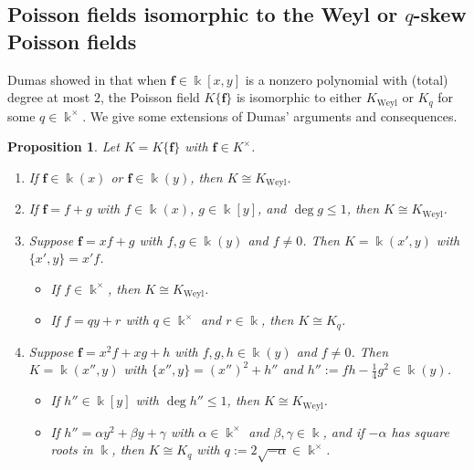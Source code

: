 \documentclass[12pt]{amsart}
\theoremstyle{plain}
\newtheorem{proposition}[theorem]{Proposition}
\numberwithin{theorem}{section}
\numberwithin{equation}{theorem}
\theoremstyle{definition}
\newcommand \bff {{\mathbf{f}}}
\DeclareMathOperator{\Weyl}{Weyl}
\newcommand \Kweyl {K_{\Weyl}}
\newcommand \kx {\Bbbk^\times}
\begin{document}
\subsection{Poisson fields isomorphic to 
the Weyl or $q$-skew Poisson fields}  
\label{zzsec1.1} 

Dumas showed in \cite{Dumas} that when 
$\bff \in \Bbbk[x,y]$ is a nonzero 
polynomial with (total) degree at most 
$2$, the Poisson field $K\{\bff\}$ is 
isomorphic to either $\Kweyl$ or $K_q$ 
for some $q \in \kx$.  We give some 
extensions of Dumas' arguments and 
consequences.

\begin{proposition}  
\label{zzpro1.1}
Let $K = K\{\bff\}$ with $\bff \in K^\times$.
\begin{enumerate}
\item[(1)] 
If $\bff \in \Bbbk(x)$ or 
$\bff \in \Bbbk(y)$, then $K \cong \Kweyl$.
\item[(2)] 
If $\bff = f+g$ with $f \in \Bbbk(x)$, 
$g \in \Bbbk[y]$, and $\deg g \le 1$,  
then $K \cong \Kweyl$.
\item[(3)] 
Suppose $\bff = xf+g$ with $f,g \in 
\Bbbk(y)$ and $f \ne 0$. Then 
$K = \Bbbk(x',y)$ with $\{x',y\} = x'f$.
\begin{itemize}
\item 
If $f \in \kx$, then $K \cong \Kweyl$.
\item 
If $f = qy+r$ with $q \in \kx$ and 
$r \in \Bbbk$, then $K \cong K_q$.
\end{itemize}
\item[(4)] 
Suppose $\bff = x^2f + xg + h$ with 
$f,g,h \in \Bbbk(y)$ and $f \ne 0$. 
Then $K = \Bbbk(x'',y)$ with 
$\{x'',y\} = (x'')^2 + h''$ and 
$h'' := fh - \frac 14 g^2 \in \Bbbk(y)$.
\begin{itemize}
\item 
If $h'' \in \Bbbk[y]$ with 
$\deg h'' \le 1$, then $K \cong \Kweyl$.
\item 
If $h'' = \alpha y^2 + \beta y 
+ \gamma$ with $\alpha \in \kx$ 
and $\beta,\gamma \in \Bbbk$, and if 
$- \alpha$ has square roots in $\Bbbk$, 
then $K \cong K_q$ with 
$q := 2 \sqrt{- \alpha} \in \kx$.
\end{itemize}
\end{enumerate}
\end{proposition}
\end{document}
